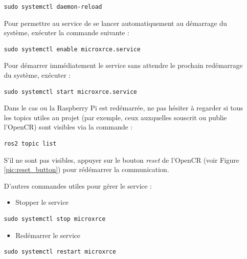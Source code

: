 \begin{lstlisting}[style=commandstyle]
sudo systemctl daemon-reload
\end{lstlisting}

\noindent Pour permettre au service de se lancer automatiquement au démarrage du système, exécuter la commande suivante :

\begin{lstlisting}[style=commandstyle]
sudo systemctl enable microxrce.service
\end{lstlisting}

\noindent Pour démarrer immédiatement le service sans attendre le prochain redémarrage du système, exécuter :

\begin{lstlisting}[style=commandstyle]
sudo systemctl start microxrce.service
\end{lstlisting}

\noindent Dans le cas ou la Raspberry Pi est redémarrée, ne pas hésiter à regarder si tous les topics utiles au projet (par exemple, ceux auxquelles souscrit ou publie l'OpenCR) sont visibles via la commande :

\begin{lstlisting}[style=commandstyle]
ros2 topic list
\end{lstlisting}

\noindent S'il ne sont pas visibles, appuyer sur le bouton \textit{reset} de l'OpenCR (voir Figure \ref{pic:reset_button}) pour rédémarrer la communication.

\noindent D'autres commandes utiles pour gérer le service : 

\begin{itemize}
    \item Stopper le service
\end{itemize}

\begin{lstlisting}[style=commandstyle]
sudo systemctl stop microxrce
\end{lstlisting}

\begin{itemize}
    \item Redémarrer le service
\end{itemize}

\begin{lstlisting}[style=commandstyle]
sudo systemctl restart microxrce
\end{lstlisting}



